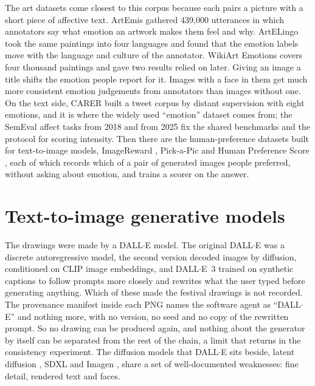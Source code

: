 The art datasets come closest to this corpus because each pairs a picture with a short piece of affective text. ArtEmis \cite{achlioptas2021artemis} gathered 439,000 utterances in which annotators say what emotion an artwork makes them feel and why. ArtELingo \cite{mohamed2022artelingo} took the same paintings into four languages and found that the emotion labels move with the language and culture of the annotator. WikiArt Emotions \cite{mohammad2018wikiart} covers four thousand paintings and gave two results relied on later. Giving an image a title shifts the emotion people report for it. Images with a face in them get much more consistent emotion judgements from annotators than images without one. On the text side, CARER \cite{saravia2018carer} built a tweet corpus by distant supervision with eight emotions, and it is where the widely used ``emotion'' dataset comes from; the SemEval affect tasks from 2018 \cite{mohammad2018semeval} and from 2025 \cite{muhammad2025semeval} fix the shared benchmarks and the protocol for scoring intensity. Then there are the human-preference datasets built for text-to-image models, ImageReward \cite{xu2023imagereward}, Pick-a-Pic \cite{kirstain2023pick} and Human Preference Score \cite{wu2023human}, each of which records which of a pair of generated images people preferred, without asking about emotion, and trains a scorer on the answer.

\section{Text-to-image generative models}
\label{sec:lit-t2i}

The drawings were made by a DALL$\cdot$E model. The original DALL$\cdot$E \cite{ramesh2021zero} was a discrete autoregressive model, the second version \cite{ramesh2022hierarchical} decoded images by diffusion, conditioned on CLIP image embeddings, and DALL$\cdot$E~3 \cite{betker2023improving} trained on synthetic captions to follow prompts more closely and rewrites what the user typed before generating anything. Which of these made the festival drawings is not recorded. The provenance manifest inside each PNG names the software agent as ``DALL$\cdot$E'' and nothing more, with no version, no seed and no copy of the rewritten prompt. So no drawing can be produced again, and nothing about the generator by itself can be separated from the rest of the chain, a limit that returns in the consistency experiment. The diffusion models that DALL$\cdot$E sits beside, latent diffusion \cite{rombach2022high}, SDXL \cite{podell2023sdxl} and Imagen \cite{saharia2022photorealistic}, share a set of well-documented weaknesses: fine detail, rendered text and faces.

